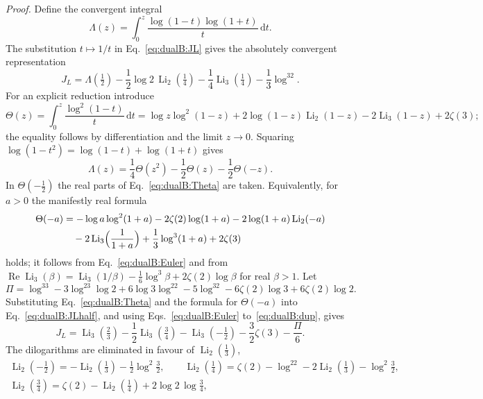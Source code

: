 \documentclass[11pt,a4paper]{article}
\numberwithin{equation}{section}
\newcommand{\dd}{\,\mathrm d}
\newcommand{\Li}{\operatorname{Li}}
\begin{document}
\emph{Proof.} Define the convergent integral
\begin{equation}
 \Lambda(z)=\int_0^z\frac{\log(1-t)\log(1+t)}{t}\dd t.
\end{equation}
The substitution $t\mapsto1/t$ in Eq.~\eqref{eq:dualB:JL} gives the absolutely convergent representation
\begin{equation}
 J_L=\Lambda(\tfrac12)-\frac12\log2\,\Li_2(\tfrac14)-\frac14\Li_3(\tfrac14)-\frac13\log^32.
 \label{eq:dualB:JLhalf}
\end{equation}
For an explicit reduction introduce
\begin{equation}
 \Theta(z)=\int_0^z\frac{\log^2(1-t)}{t}\dd t=\log z\log^2(1-z)+2\log(1-z)\Li_2(1-z)-2\Li_3(1-z)+2\zeta(3);
 \label{eq:dualB:Theta}
\end{equation}
the equality follows by differentiation and the limit $z\to0$. Squaring $\log(1-t^2)=\log(1-t)+\log(1+t)$ gives
\begin{equation}
 \Lambda(z)=\frac14\Theta(z^2)-\frac12\Theta(z)-\frac12\Theta(-z).
\end{equation}
In $\Theta(-\frac12)$ the real parts of Eq.~\eqref{eq:dualB:Theta} are taken. Equivalently, for $a>0$ the manifestly
real formula
\begin{equation}
\begin{aligned}
 \Theta(-a)&=-\log a\log^2(1+a)-2\zeta(2)\log(1+a)-2\log(1+a)\Li_2(-a)\\
 &\quad-2\Li_3\Bigl(\frac1{1+a}\Bigr)+\frac13\log^3(1+a)+2\zeta(3)
\end{aligned}
\end{equation}
holds; it follows from Eq.~\eqref{eq:dualB:Euler} and from
$\operatorname{Re}\Li_3(\beta)=\Li_3(1/\beta)-\frac16\log^3\beta+2\zeta(2)\log\beta$ for real $\beta>1$. Let
\begin{equation}
 \Pi=\log^33-3\log^23\log2+6\log3\log^22-5\log^32-6\zeta(2)\log3+6\zeta(2)\log2.
\end{equation}
Substituting Eq.~\eqref{eq:dualB:Theta} and the formula for $\Theta(-a)$ into Eq.~\eqref{eq:dualB:JLhalf}, and using
Eqs.~\eqref{eq:dualB:Euler} to~\eqref{eq:dualB:dup}, gives
\begin{equation}
 J_L=\Li_3(\tfrac23)-\frac12\Li_3(\tfrac34)-\Li_3(-\tfrac12)-\frac32\zeta(3)-\frac\Pi6.
 \label{eq:dualB:JLreduced}
\end{equation}
The dilogarithms are eliminated in favour of $\Li_2(\frac13)$,
\begin{equation}
\begin{gathered}
 \Li_2(-\tfrac12)=-\Li_2(\tfrac13)-\tfrac12\log^2\tfrac32,\qquad
 \Li_2(\tfrac14)=\zeta(2)-\log^22-2\Li_2(\tfrac13)-\log^2\tfrac32,\\
 \Li_2(\tfrac34)=\zeta(2)-\Li_2(\tfrac14)+2\log2\,\log\tfrac34,
\end{gathered}
\end{equation}
\end{document}
